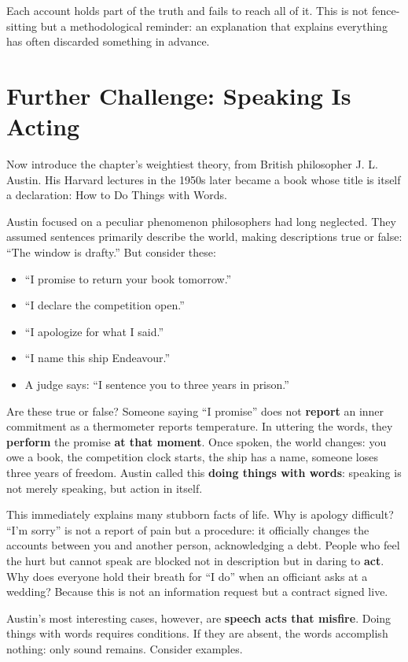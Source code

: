 Each account holds part of the truth and fails to reach all of it. This is not fence-sitting but a methodological reminder: an explanation that explains everything has often discarded something in advance.

\section{Further Challenge: Speaking Is Acting}
Now introduce the chapter's weightiest theory, from British philosopher J. L. Austin. His Harvard lectures in the 1950s later became a book whose title is itself a declaration: How to Do Things with Words.

Austin focused on a peculiar phenomenon philosophers had long neglected. They assumed sentences primarily describe the world, making descriptions true or false: ``The window is drafty.'' But consider these:

\begin{itemize}
\item ``I promise to return your book tomorrow.''
\item ``I declare the competition open.''
\item ``I apologize for what I said.''
\item ``I name this ship Endeavour.''
\item A judge says: ``I sentence you to three years in prison.''
\end{itemize}
Are these true or false? Someone saying ``I promise'' does not \textbf{report} an inner commitment as a thermometer reports temperature. In uttering the words, they \textbf{perform} the promise \textbf{at that moment}. Once spoken, the world changes: you owe a book, the competition clock starts, the ship has a name, someone loses three years of freedom. Austin called this \textbf{doing things with words}: speaking is not merely speaking, but action in itself.

This immediately explains many stubborn facts of life. Why is apology difficult? ``I'm sorry'' is not a report of pain but a procedure: it officially changes the accounts between you and another person, acknowledging a debt. People who feel the hurt but cannot speak are blocked not in description but in daring to \textbf{act}. Why does everyone hold their breath for ``I do'' when an officiant asks at a wedding? Because this is not an information request but a contract signed live.

Austin's most interesting cases, however, are \textbf{speech acts that misfire}. Doing things with words requires conditions. If they are absent, the words accomplish nothing: only sound remains. Consider examples.

